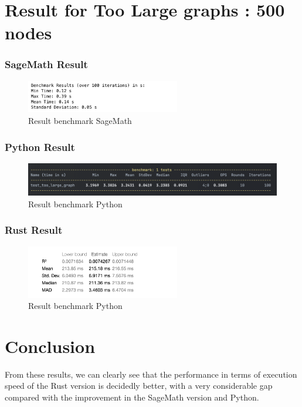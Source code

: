\section{Result for Too Large graphs : 500 nodes}\label{sec:result-for-too-large-graphs}

\subsubsection*{SageMath Result}
\begin{figure}[!h]
    \centering
    \includegraphics[width=0.60\textwidth]{images/benchmark/too_large_graph/benchmark_too_large_graph_sagemath}
    \caption{Result benchmark SageMath}
    \label{fig:benchmark-too-large-graph-sagemath}
\end{figure}

\subsubsection*{Python Result}
\begin{figure}[!h]
    \centering
    \includegraphics[width=1\textwidth]{images/benchmark/too_large_graph/benchmark_too_large_graph_python}
    \caption{Result benchmark Python}
    \label{fig:benchmark-too-large-graph-python}
\end{figure}

\subsubsection*{Rust Result}
\begin{figure}[!h]
    \centering
    \includegraphics[width=0.60\textwidth]{images/benchmark/too_large_graph/benchmark_too_large_graph_rust}
    \caption{Result benchmark Python}
    \label{fig:benchmark-too-large-graph-rust}
\end{figure}


\section{Conclusion}\label{sec:conclusion}

From these results, we can clearly see that the performance in terms of execution speed of the Rust version is decidedly better, with a very considerable gap compared with the improvement in the SageMath version and Python.


